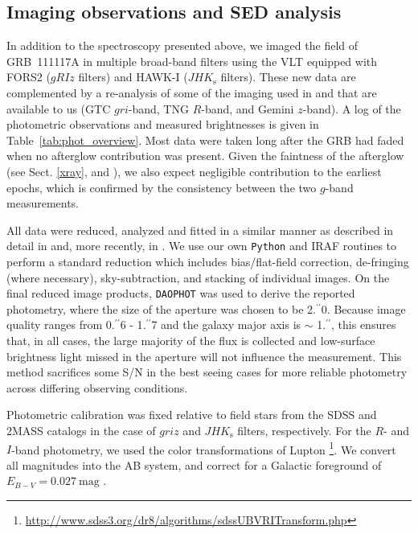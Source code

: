 \documentclass[referee]{aa}
\newcommand{\farc}{\hbox{$.\!\!^{\prime\prime}$}}
\begin{document}
\subsection{Imaging observations and SED analysis} \label{SED}

In addition to the spectroscopy presented above, we imaged the field of
GRB~111117A in multiple broad-band filters using the VLT equipped with FORS2
($gRIz$ filters) and HAWK-I ($JHK_{\mathrm{s}}$ filters). These new data are
complemented by a re-analysis of some of the imaging used in
\citet{Margutti2012} and \citet{Sakamoto2013} that are available to us (GTC
$gri$-band, TNG $R$-band, and Gemini $z$-band). A log of the photometric
observations and measured brightnesses is given in
Table~\ref{tab:phot_overview}. Most data were taken long after the GRB had faded
when no afterglow contribution was present. Given the faintness of the afterglow
(see Sect. \ref{xray}, and \citealt{Cucchiara2011, Cenko2011}), we also expect
negligible contribution to the earliest epochs, which is confirmed by the
consistency between the two $g$-band measurements.

All data were reduced, analyzed and fitted in a similar manner as described in
detail in \citet{Kruhler2011a} and, more recently, in \citet{Schulze2016}. We
use our own \texttt{Python} and IRAF routines to perform a standard reduction
which includes bias/flat-field correction, de-fringing (where necessary),
sky-subtraction, and stacking of individual images. On the final reduced image
products, \texttt{DAOPHOT} \citep{Stetson1987} was used to derive the reported
photometry, where the size of the aperture was chosen to be 2\farc0. Because
image quality ranges from 0\farc6 - 1\farc7 and the galaxy major axis is $\sim$
1\farc, this ensures that, in all cases, the large majority of the flux is
collected and low-surface brightness light missed in the aperture will not
influence the measurement. This method sacrifices some S/N in the best seeing
cases for more reliable photometry across differing observing conditions.

Photometric calibration was fixed relative to field stars from the SDSS and
2MASS catalogs in the case of $griz$ and $JHK_{\mathrm{s}}$ filters,
respectively. For the $R$- and $I$-band photometry, we used the color
transformations of Lupton%
\footnote{\url{http://www.sdss3.org/dr8/algorithms/sdssUBVRITransform.php}}. We
convert all magnitudes into the AB system, and correct for a Galactic foreground
of $E_{B-V}=0.027~\mathrm{mag}$ \citep{Schlegel1998, Schlafly2011}.
\end{document}
